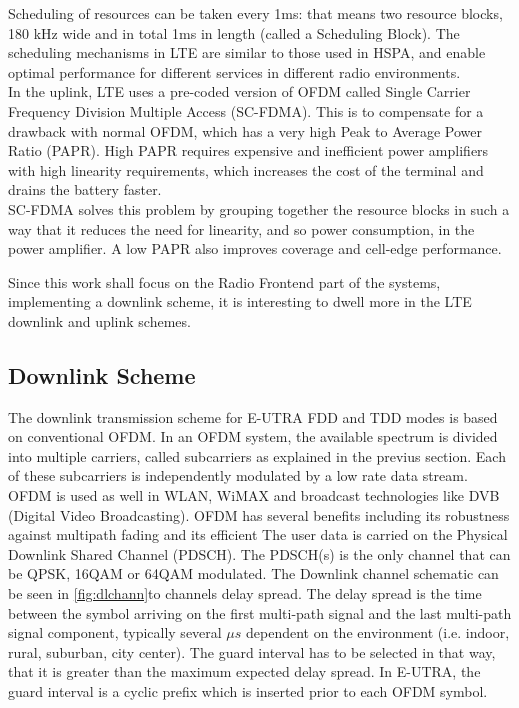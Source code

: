 Scheduling of resources can be taken every 1ms: that means two resource blocks,
180 kHz wide and in total 1ms in length (called a Scheduling Block). The scheduling
mechanisms in LTE are similar to those used in HSPA, and enable optimal performance
for different services in different radio environments.\\

In the uplink, LTE uses a pre-coded version of OFDM called Single Carrier Frequency
Division Multiple Access (SC-FDMA). This is to compensate for a drawback with normal
OFDM, which has a very high Peak to Average Power Ratio (PAPR). High PAPR requires
expensive and inefficient power amplifiers with high linearity requirements, which
increases the cost of the terminal and drains the battery faster.\\

SC-FDMA solves this problem by grouping together the resource blocks in such a
way that it reduces the need for linearity, and so power consumption, in the
power amplifier. A low PAPR also improves coverage and cell-edge performance.

Since this work shall focus on the Radio Frontend part of the systems, implementing
a downlink scheme, it is interesting to dwell more in the LTE downlink and uplink
schemes.

\subsection{Downlink Scheme}%

 The downlink transmission scheme for E-UTRA FDD and TDD modes is based on
conventional OFDM. In an OFDM system, the available spectrum is divided into
multiple carriers, called subcarriers as explained in the previus section. Each
of these subcarriers is independently modulated by a low rate data stream. OFDM
is used as well in WLAN, WiMAX and broadcast technologies like DVB (Digital
Video Broadcasting). OFDM has several benefits including its robustness against
multipath fading and its efficient The user data is carried on the Physical
Downlink Shared Channel (PDSCH). The PDSCH(s) is the only channel that can be
QPSK, 16QAM or 64QAM modulated. The Downlink channel schematic can be seen in
\ref{fig:dlchann}to channels delay spread. The delay spread is the time between
the symbol arriving on the first multi-path signal and the last multi-path
signal component, typically several $\mu s$ dependent on the environment (i.e.
indoor, rural, suburban, city center). The guard interval has to be selected in
that way, that it is greater than the maximum expected delay spread. In E-UTRA,
the guard interval is a cyclic prefix which is inserted prior to each OFDM
symbol.\\

